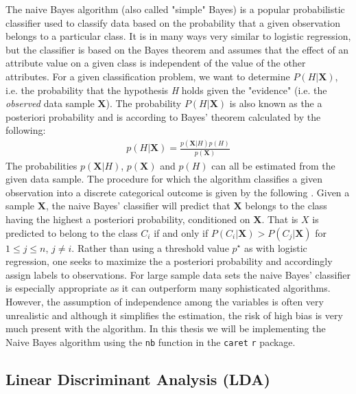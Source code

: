 \documentclass[../thesis.tex]{subfiles}
\begin{document}
\noindent The naive Bayes algorithm (also called "simple" Bayes) is a popular probabilistic classifier used to classify data based on the probability that a given observation belongs to a particular class. It is in many ways very similar to logistic regression, but the classifier is based on the Bayes theorem and assumes that the effect of an attribute value on a given class is independent of the value of the other attributes. For a given classification problem, we want to determine $P(H | \boldsymbol{X})$, i.e. the probability that the hypothesis \textit{H} holds given the "evidence" (i.e. the \textit{observed} data sample $\boldsymbol{X}$). The probability $P(H | \boldsymbol{X})$ is also known as the a posteriori probability and is according to Bayes' theorem calculated by the following:
\begin{align}
    p(H | \boldsymbol{X}) = \frac{p(\boldsymbol{X}|H) p(H)}{p(\boldsymbol{X})} 
\end{align}
\noindent The probabilities $p(\boldsymbol{X}|H)$, $p(\boldsymbol{X})$ and $p(H)$ can all be estimated from the given data sample. The procedure for which the algorithm classifies a given observation into a discrete categorical outcome is given by the following \citep{leung2007naive}. Given a sample $\boldsymbol{X}$, the naive Bayes' classifier will predict that $\boldsymbol{X}$ belongs to the class having the highest a posteriori probability, conditioned on $\boldsymbol{X}$. That is $X$ is predicted to belong to the class $C_i$ if and only if $P(C_i| \boldsymbol{X}) > P(C_j | \boldsymbol{X})$ for $1 \leq j \leq n$, $j \neq i$. Rather than using a threshold value $p^\star$ as with logistic regression, one seeks to maximize the a posteriori probability and accordingly assign labels to observations. For large sample data sets the naive Bayes' classifier is especially appropriate as it can outperform many sophisticated algorithms. However, the assumption of independence among the variables is often very unrealistic and although it simplifies the estimation, the risk of high bias is very much present with the algorithm. In this thesis we will be implementing the Naive Bayes algorithm using the \texttt{nb} function in the \texttt{caret}\citep{kuhncaret} \texttt{r} package.

\subsection{Linear Discriminant Analysis (LDA)}
\label{subsec:lda}
\end{document}
